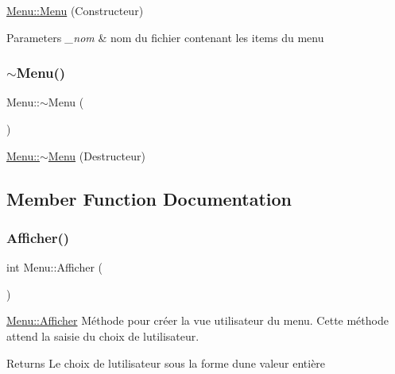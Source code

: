 \hyperlink{class_menu_a0540324b94e45b51182db9a30393e27b}{Menu\+::\+Menu} (Constructeur) 


\begin{DoxyParams}{Parameters}
{\em \+\_\+nom} & nom du fichier contenant les items du menu \\
\hline
\end{DoxyParams}
\mbox{\label{class_menu_a831387f51358cfb88cd018e1777bc980}} 
\subsubsection{\texorpdfstring{$\sim$\+Menu()}{~Menu()}}
{\footnotesize\ttfamily Menu\+::$\sim$\+Menu (\begin{DoxyParamCaption}{ }\end{DoxyParamCaption})}



\hyperlink{class_menu_a831387f51358cfb88cd018e1777bc980}{Menu\+::$\sim$\+Menu} (Destructeur) 



\subsection{Member Function Documentation}
\mbox{\label{class_menu_a079e0c6a24248a07993b48b310ba65ce}} 
\subsubsection{\texorpdfstring{Afficher()}{Afficher()}}
{\footnotesize\ttfamily int Menu\+::\+Afficher (\begin{DoxyParamCaption}{ }\end{DoxyParamCaption})}



\hyperlink{class_menu_a079e0c6a24248a07993b48b310ba65ce}{Menu\+::\+Afficher} Méthode pour créer la vue utilisateur du menu. Cette méthode attend la saisie du choix de l\textquotesingle{}utilisateur. 

\begin{DoxyReturn}{Returns}
Le choix de l\textquotesingle{}utilisateur sous la forme d\textquotesingle{}une valeur entière 
\end{DoxyReturn}
\mbox{\label{class_menu_a6ddcaabf2fedb30f5136f3be655d60ce}} 
